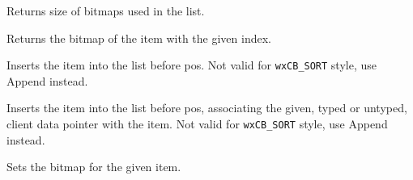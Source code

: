 \label{wxbitmapcomboboxgetbitmapsize}


Returns size of bitmaps used in the list.


\label{wxbitmapcomboboxgetitembitmap}


Returns the bitmap of the item with the given index.


\label{wxbitmapcomboboxinsert}


Inserts the item into the list before pos.
Not valid for {\tt wxCB\_SORT} style, use Append instead.



Inserts the item into the list before pos, associating the given, typed or
untyped, client data pointer with the item.
Not valid for {\tt wxCB\_SORT} style, use Append instead.


\label{wxbitmapcomboboxsetitembitmap}


Sets the bitmap for the given item.


